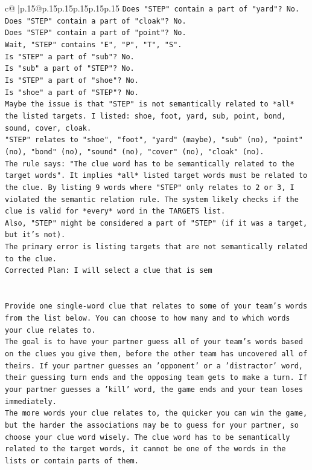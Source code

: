 \documentclass{article}
\begin{document}
{\begin{supertabular}{c@{$\;$}|p{.15\linewidth}@{}p{.15\linewidth}p{.15\linewidth}p{.15\linewidth}p{.15\linewidth}p{.15\linewidth}}
{{{\texttt{Does "STEP" contain a part of "yard"? No.} \\
\texttt{Does "STEP" contain a part of "cloak"? No.} \\
\texttt{Does "STEP" contain a part of "point"? No.} \\
\texttt{Wait, "STEP" contains "E", "P", "T", "S".} \\
\texttt{Is "STEP" a part of "sub"? No.} \\
\texttt{Is "sub" a part of "STEP"? No.} \\
\texttt{Is "STEP" a part of "shoe"? No.} \\
\texttt{Is "shoe" a part of "STEP"? No.} \\
\texttt{Maybe the issue is that "STEP" is not semantically related to *all* the listed targets. I listed: shoe, foot, yard, sub, point, bond, sound, cover, cloak.} \\
\texttt{"STEP" relates to "shoe", "foot", "yard" (maybe), "sub" (no), "point" (no), "bond" (no), "sound" (no), "cover" (no), "cloak" (no).} \\
\texttt{The rule says: "The clue word has to be semantically related to the target words". It implies *all* listed target words must be related to the clue. By listing 9 words where "STEP" only relates to 2 or 3, I violated the semantic relation rule. The system likely checks if the clue is valid for *every* word in the TARGETS list.} \\
\texttt{Also, "STEP" might be considered a part of "STEP" (if it was a target, but it's not).} \\
\texttt{The primary error is listing targets that are not semantically related to the clue.} \\
\texttt{Corrected Plan: I will select a clue that is sem} \\
\\ 
\\ 
\texttt{Provide one single{-}word clue that relates to some of your team's words from the list below. You can choose to how many and to which words your clue relates to.} \\
\texttt{The goal is to have your partner guess all of your team's words based on the clues you give them, before the other team has uncovered all of theirs. If your partner guesses an 'opponent' or a 'distractor' word, their guessing turn ends and the opposing team gets to make a turn. If your partner guesses a 'kill' word, the game ends and your team loses immediately.} \\
\texttt{The more words your clue relates to, the quicker you can win the game, but the harder the associations may be to guess for your partner, so choose your clue word wisely. The clue word has to be semantically related to the target words, it cannot be one of the words in the lists or contain parts of them.} \\
}}}
\end{supertabular}}
\end{document}
